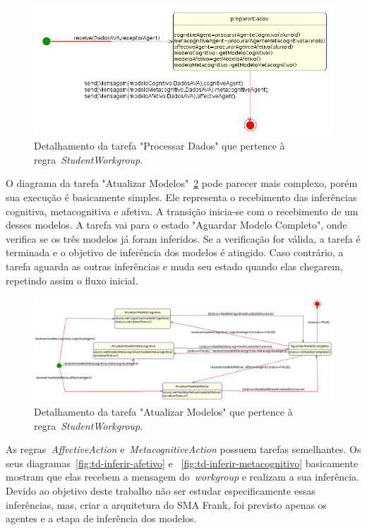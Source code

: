 \begin{figure}
	\centering
	\includegraphics[scale=0.48]{images/td-processar-dados.png}
	\caption{Detalhamento da tarefa "Processar Dados" que pertence à regra~\emph{StudentWorkgroup}.}
	\label{fig:td-processar-dados}
\end{figure}

O diagrama da tarefa "Atualizar Modelos"~\ref{fig:td-atualizar-modelos} pode parecer mais complexo, porém sua execução é basicamente simples. Ele representa o recebimento das inferências cognitiva, metacognitiva e afetiva. A transição inicia-se com o recebimento de um desses modelos. A tarefa vai para o estado "Aguardar Modelo Completo", onde verifica se os três modelos já foram inferidos. Se a verificação for válida, a tarefa é terminada e o objetivo de inferência dos modelos é atingido. Caso contrário, a tarefa aguarda as outras inferências e muda seu estado quando elas chegarem, repetindo assim o fluxo inicial.

\begin{figure}
	\centering
	\includegraphics[scale=0.4]{images/td-atualizar-modelos.png}
	\caption{Detalhamento da tarefa "Atualizar Modelos" que pertence à regra~\emph{StudentWorkgroup}.}
	\label{fig:td-atualizar-modelos}
\end{figure}

As regras~\emph{AffectiveAction} e~\emph{MetacognitiveAction} possuem tarefas semelhantes. Os seus diagramas~\ref{fig:td-inferir-afetivo} e ~\ref{fig:td-inferir-metacognitivo} basicamente mostram que elas recebem a mensagem do~\emph{workgroup} e realizam a sua inferência. Devido ao objetivo deste trabalho não ser estudar especificamente essas inferências, mas, criar a arquitetura do SMA Frank, foi previsto apenas os agentes e a etapa de inferência dos modelos.

